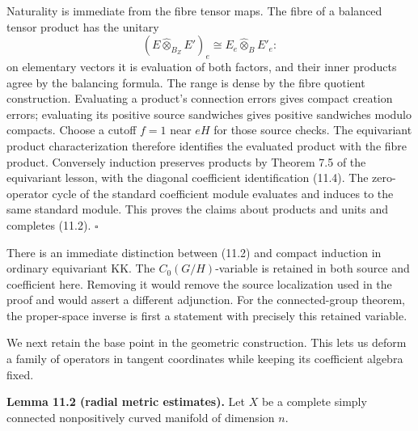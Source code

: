 \documentclass[
  11pt,
]{article}
\begin{document}
Naturality is immediate from the fibre tensor maps. The fibre of a
balanced tensor product has the unitary \[
(E\widehat\otimes_{B_Z}E')_e
\cong E_e\widehat\otimes_B E'_e:
\tag{11.6}
\] on elementary vectors it is evaluation of both factors, and their
inner products agree by the balancing formula. The range is dense by the
fibre quotient construction. Evaluating a product's connection errors
gives compact creation errors; evaluating its positive source sandwiches
gives positive sandwiches modulo compacts. Choose a cutoff \(f=1\) near
\(eH\) for those source checks. The equivariant product characterization
therefore identifies the evaluated product with the fibre product.
Conversely induction preserves products by Theorem 7.5 of the
equivariant lesson, with the diagonal coefficient identification (11.4).
The zero-operator cycle of the standard coefficient module evaluates and
induces to the same standard module. This proves the claims about
products and units and completes (11.2). \(\square\)

There is an immediate distinction between (11.2) and compact induction
in ordinary equivariant KK. The \(C_0(G/H)\)-variable is retained in
both source and coefficient here. Removing it would remove the source
localization used in the proof and would assert a different adjunction.
For the connected-group theorem, the proper-space inverse is first a
statement with precisely this retained variable.

We next retain the base point in the geometric construction. This lets
us deform a family of operators in tangent coordinates while keeping its
coefficient algebra fixed.

\textbf{Lemma 11.2 (radial metric estimates).} Let \(X\) be a complete
simply connected nonpositively curved manifold of dimension \(n\).
\end{document}
